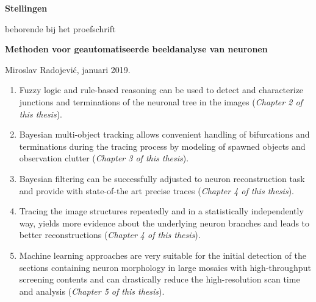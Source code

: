 \documentclass[10pt]{report}
\begin{document}
\pagestyle{empty}
\setlength{\leftmargini}{0em}

\begin{center}
  {\Large\bf Stellingen}

  \medskip

  behorende bij het proefschrift

  \medskip

  {\large\bf  Methoden voor geautomatiseerde beeldanalyse van neuronen}

  \medskip

  Miroslav Radojevi\'{c}, januari 2019.
\end{center}

\bigskip
\small

\begin{enumerate}
  
\item Fuzzy logic and rule-based reasoning can be used to detect and characterize junctions and terminations of the neuronal tree in the images (\emph{Chapter 2 of this thesis}). 

\medskip
  
\item Bayesian multi-object tracking allows convenient handling of bifurcations and terminations during the tracing process by modeling of spawned objects and observation clutter (\emph{Chapter 3 of this thesis}).  
  
\medskip

\item Bayesian filtering can be successfully adjusted to neuron reconstruction task and provide with state-of-the art precise traces (\emph{Chapter 4 of this thesis}).
	
\medskip

\item Tracing the image structures repeatedly and in a statistically independently way, yields more evidence about the underlying neuron branches and leads to better reconstructions (\emph{Chapter 4 of this thesis}).

\medskip

\item Machine learning approaches are very suitable for the initial detection of the sections containing neuron morphology in large mosaics with high-throughput screening contents and can drastically reduce the high-resolution scan time and analysis (\emph{Chapter 5 of this thesis}).


\end{enumerate}
\end{document}
